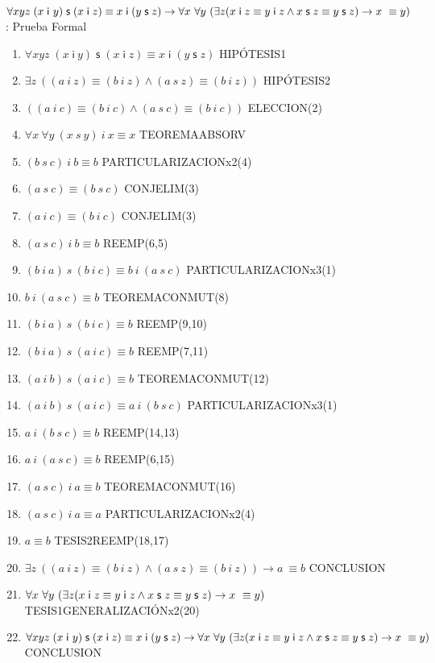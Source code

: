 \documentclass[10pt]{beamer}
\newcommand{\Cfont}{\fontsize{5.5}{7.2}\selectfont}
\newcommand{\Cfonti}{\fontsize{8.5}{7.2}\selectfont}
\newcommand{\Nand}{\wedge}
\newcommand{\idistr}{\forall xyz\;(x\;\mathsf{i}\
y)\;\mathsf{s}\;(x\;\mathsf{i}\;z)\equiv x\;\mathsf{i}\;(y\;\mathsf{s}%
\;z)}
\newcommand{\myconj}{x\;\mathsf{i}\;z\equiv y\;\mathsf{%
i}\;z\wedge x\;\mathsf{s}\;z\equiv y\;\mathsf{s}\;z}
\begin{document}
\begin{frame}{\Cfonti$\idistr \rightarrow \forall x\ \forall y\ (\exists z (\myconj) \rightarrow x\ \equiv y)$:
    Prueba Formal
}
\Cfont
  \begin{enumerate}[<+->]
    \item $ \idistr $ \hfill HIPÓTESIS1
    \item $ \exists z\ ((a\ i\ z) \equiv (b\ i\ z) \Nand (a\ s\ z) \equiv (b\ i\ z))$ \hfill HIPÓTESIS2
    \item $ ((a\ i\ c) \equiv (b\ i\ c) \Nand (a\ s\ c) \equiv (b\ i\ c))$ \hfill ELECCION(2)
    \item $ \forall x\ \forall y\ (x\ s\ y)\ i\ x \equiv x$ \hfill TEOREMAABSORV
    \item $ (b\ s\ c)\ i\ b \equiv b$ \hfill PARTICULARIZACIONx2(4)
    \item $ (a\ s\ c) \equiv (b\ s\ c) $ \hfill CONJELIM(3)
    \item $ (a\ i\ c) \equiv (b\ i\ c) $ \hfill CONJELIM(3)

    \item $ (a\ s\ c)\ i\ b \equiv b$ \hfill REEMP(6,5)
    \item $ (b\ i\ a)\ s\ (b\ i\ c) \equiv b\ i\ (a\ s\ c) $ \hfill PARTICULARIZACIONx3(1)
    \item $ b\ i\ (a\ s\ c) \equiv b$ \hfill TEOREMACONMUT(8)
    \item $ (b\ i\ a)\ s\ (b\ i\ c) \equiv b$ \hfill REEMP(9,10)

    \item $ (b\ i\ a)\ s\ (a\ i\ c) \equiv b$ \hfill REEMP(7,11)
    \item $ (a\ i\ b)\ s\ (a\ i\ c) \equiv b$ \hfill TEOREMACONMUT(12)
    \item $ (a\ i\ b)\ s\ (a\ i\ c) \equiv a\ i\ (b\ s\ c)$ \hfill PARTICULARIZACIONx3(1)
    \item $ a\ i\ (b\ s\ c) \equiv b $ \hfill REEMP(14,13)
    \item $ a\ i\ (a\ s\ c) \equiv b $ \hfill REEMP(6,15)
    \item $ (a\ s\ c)\ i\ a \equiv b$ \hfill TEOREMACONMUT(16)
    \item $ (a\ s\ c)\ i\ a \equiv a$ \hfill PARTICULARIZACIONx2(4)
    \item $ a \equiv b$ \hfill TESIS2REEMP(18,17)
    \item $ \exists z\ ((a\ i\ z) \equiv (b\ i\ z) \Nand (a\ s\ z) \equiv (b\ i\ z)) \rightarrow a\ \equiv b$ \hfill CONCLUSION
    \item $ \forall x\ \forall y\ (\exists z (\myconj) \rightarrow x\ \equiv y)$ \hfill TESIS1GENERALIZACIÓNx2(20)
    \item $ \idistr \rightarrow \forall x\ \forall y\ (\exists z (\myconj) \rightarrow x\ \equiv y)$ \hfill CONCLUSION

  \end{enumerate}
  \setcounter{equation}{0}

\end{frame}
\end{document}
